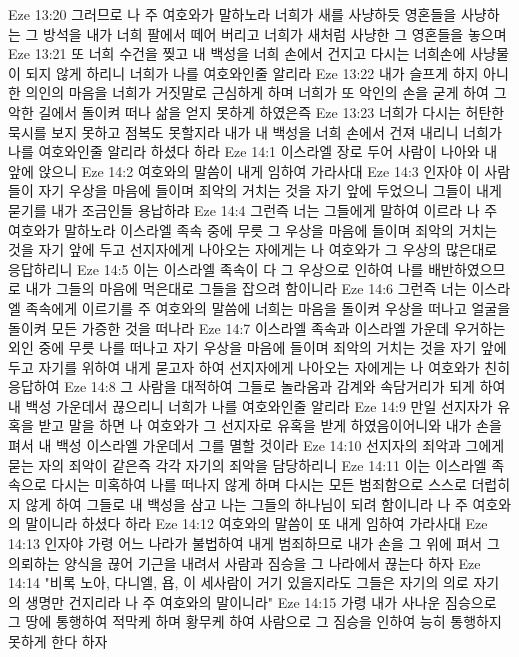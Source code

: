 Eze 13:20  그러므로 나 주 여호와가 말하노라 너희가 새를 사냥하듯 영혼들을 사냥하는 그 방석을 내가 너희 팔에서 떼어 버리고 너희가 새처럼 사냥한 그 영혼들을 놓으며
Eze 13:21  또 너희 수건을 찢고 내 백성을 너희 손에서 건지고 다시는 너희손에 사냥물이 되지 않게 하리니 너희가 나를 여호와인줄 알리라
Eze 13:22  내가 슬프게 하지 아니한 의인의 마음을 너희가 거짓말로 근심하게 하며 너희가 또 악인의 손을 굳게 하여 그 악한 길에서 돌이켜 떠나 삶을 얻지 못하게 하였은즉
Eze 13:23  너희가 다시는 허탄한 묵시를 보지 못하고 점복도 못할지라 내가 내 백성을 너희 손에서 건져 내리니 너희가 나를 여호와인줄 알리라 하셨다 하라
Eze 14:1  이스라엘 장로 두어 사람이 나아와 내 앞에 앉으니
Eze 14:2  여호와의 말씀이 내게 임하여 가라사대
Eze 14:3  인자야 이 사람들이 자기 우상을 마음에 들이며 죄악의 거치는 것을 자기 앞에 두었으니 그들이 내게 묻기를 내가 조금인들 용납하랴
Eze 14:4  그런즉 너는 그들에게 말하여 이르라 나 주 여호와가 말하노라 이스라엘 족속 중에 무릇 그 우상을 마음에 들이며 죄악의 거치는 것을 자기 앞에 두고 선지자에게 나아오는 자에게는 나 여호와가 그 우상의 많은대로 응답하리니
Eze 14:5  이는 이스라엘 족속이 다 그 우상으로 인하여 나를 배반하였으므로 내가 그들의 마음에 먹은대로 그들을 잡으려 함이니라
Eze 14:6  그런즉 너는 이스라엘 족속에게 이르기를 주 여호와의 말씀에 너희는 마음을 돌이켜 우상을 떠나고 얼굴을 돌이켜 모든 가증한 것을 떠나라
Eze 14:7  이스라엘 족속과 이스라엘 가운데 우거하는 외인 중에 무릇 나를 떠나고 자기 우상을 마음에 들이며 죄악의 거치는 것을 자기 앞에 두고 자기를 위하여 내게 묻고자 하여 선지자에게 나아오는 자에게는 나 여호와가 친히 응답하여
Eze 14:8  그 사람을 대적하여 그들로 놀라움과 감계와 속담거리가 되게 하여 내 백성 가운데서 끊으리니 너희가 나를 여호와인줄 알리라
Eze 14:9  만일 선지자가 유혹을 받고 말을 하면 나 여호와가 그 선지자로 유혹을 받게 하였음이어니와 내가 손을 펴서 내 백성 이스라엘 가운데서 그를 멸할 것이라
Eze 14:10  선지자의 죄악과 그에게 묻는 자의 죄악이 같은즉 각각 자기의 죄악을 담당하리니
Eze 14:11  이는 이스라엘 족속으로 다시는 미혹하여 나를 떠나지 않게 하며 다시는 모든 범죄함으로 스스로 더럽히지 않게 하여 그들로 내 백성을 삼고 나는 그들의 하나님이 되려 함이니라 나 주 여호와의 말이니라 하셨다 하라
Eze 14:12  여호와의 말씀이 또 내게 임하여 가라사대
Eze 14:13  인자야 가령 어느 나라가 불법하여 내게 범죄하므로 내가 손을 그 위에 펴서 그 의뢰하는 양식을 끊어 기근을 내려서 사람과 짐승을 그 나라에서 끊는다 하자
Eze 14:14  "비록 노아, 다니엘, 욥, 이 세사람이 거기 있을지라도 그들은 자기의 의로 자기의 생명만 건지리라 나 주 여호와의 말이니라"
Eze 14:15  가령 내가 사나운 짐승으로 그 땅에 통행하여 적막케 하며 황무케 하여 사람으로 그 짐승을 인하여 능히 통행하지 못하게 한다 하자
